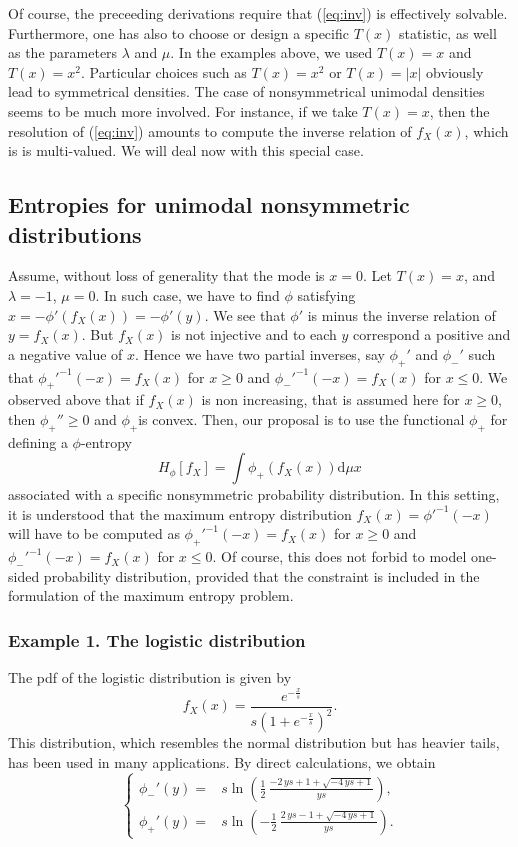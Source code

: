 \documentclass[english,onecolumn]{elsarticle}
\def\dmu{\mathrm{d}\mu}
\begin{document}
Of course, the preceeding derivations require that (\ref{eq:inv})
is effectively solvable. Furthermore, one has also to choose or design
a specific $T(x)$ statistic, as well as the parameters $\lambda$
and $\mu$. In the examples above, we used $T(x)=x$ and $T(x)=x^{2}.$
Particular choices such as $T(x)=x^{2}$ or $T(x)=|x|$ obviously
lead to symmetrical densities. The case of nonsymmetrical unimodal
densities seems to be much more involved. For instance, if we take
$T(x)=x$, then the resolution of (\ref{eq:inv}) amounts to compute
the inverse relation of $f_{X}(x)$, which is is multi-valued. We
will deal now with this special case. 


\subsection{Entropies for unimodal nonsymmetric distributions}

Assume, without loss of generality that the mode is $x=0.$ Let $T(x)=x$,
and $\lambda=-1$, $\mu=0.$ In such case, we have to find $\phi$
satisfying $x=-\phi'\left(f_{X}(x)\right)=-\phi'(y)$. We see that
$\phi'$ is minus the inverse relation of $y=f_{X}(x)$. But $f_{X}(x)$
is not injective and to each $y$ correspond a positive and a negative
value of $x.$ Hence we have two partial inverses, say $\phi_{+}'$
and $\phi_{-}'$ such that $\phi_{+}'^{-1}(-x)=f_{X}(x)$ for $x\geq0$
and $\phi_{-}'^{-1}(-x)=f_{X}(x)$ for $x\leq0$. We observed above
that if $f_{X}(x)$ is non increasing, that is assumed here for $x\geq0,$
then $\phi_{+}''\geq0$ and $\phi_{+}$is convex. Then, our proposal
is to use the functional $\phi_{+}$ for defining a $\phi$-entropy
\[
H_{\phi}[f_{X}]=\int\phi_{+}\left(f_{X}(x)\right)\dmu x
\]
associated with a specific nonsymmetric probability distribution.
In this setting, it is understood that the maximum entropy distribution
$f_{X}(x)=\phi'^{-1}(-x)$ will have to be computed as $\phi_{+}'^{-1}(-x)=f_{X}(x)$
for $x\geq0$ and $\phi_{-}'^{-1}(-x)=f_{X}(x)$ for $x\leq0$. Of
course, this does not forbid to model one-sided probability distribution,
provided that the constraint is included in the formulation of the
maximum entropy problem. 


\subsubsection{Example 1. The logistic distribution}

The pdf of the logistic distribution is given by
\[
f_{X}(x)=\frac{e^{-\frac{x}{s}}}{s\left(1+e^{-\frac{x}{s}}\right)^{2}}.
\]
This distribution, which resembles the normal distribution but has
heavier tails, has been used in many applications. By direct calculations,
we obtain 
\[
\begin{cases}
\phi_{-}'(y)= & s\ln\left(\frac{1}{2}\,{\frac{-2\, ys+1+\sqrt{-4\, ys+1}}{ys}}\right),\\
\phi_{+}'(y)= & s\ln\left(-\frac{1}{2}\,{\frac{2\, ys-1+\sqrt{-4\, ys+1}}{ys}}\right).
\end{cases}
\]
\end{document}
